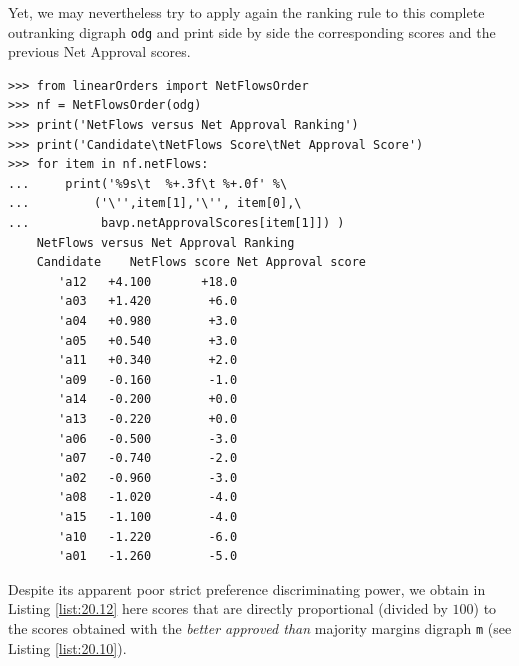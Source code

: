 Yet, we may nevertheless try to apply again the \NetFlows ranking rule to this complete outranking digraph \texttt{odg} and print side by side the corresponding \NetFlows scores and the previous Net Approval scores. 
\begin{lstlisting}[caption={Comparing the \NetFlows and the Net Approval rankings},label=list:20.12]
>>> from linearOrders import NetFlowsOrder
>>> nf = NetFlowsOrder(odg)
>>> print('NetFlows versus Net Approval Ranking')
>>> print('Candidate\tNetFlows Score\tNet Approval Score')
>>> for item in nf.netFlows:
...     print('%9s\t  %+.3f\t %+.0f' %\
...         ('\'',item[1],'\'', item[0],\
...          bavp.netApprovalScores[item[1]]) )  
    NetFlows versus Net Approval Ranking
    Candidate    NetFlows score	Net Approval score
       'a12	  +4.100	   +18.0
       'a03	  +1.420	    +6.0
       'a04	  +0.980	    +3.0
       'a05	  +0.540	    +3.0
       'a11	  +0.340	    +2.0
       'a09	  -0.160	    -1.0
       'a14	  -0.200	    +0.0
       'a13	  -0.220	    +0.0
       'a06	  -0.500	    -3.0
       'a07	  -0.740	    -2.0
       'a02	  -0.960	    -3.0
       'a08	  -1.020	    -4.0
       'a15	  -1.100	    -4.0
       'a10	  -1.220	    -6.0
       'a01	  -1.260	    -5.0
\end{lstlisting}
Despite its apparent poor strict preference discriminating power, we obtain in Listing \ref{list:20.12} here \NetFlows scores that are directly proportional (divided by $100$) to the scores obtained with the \emph{better approved than} majority margins digraph \texttt{m} (see Listing \ref{list:20.10}).


